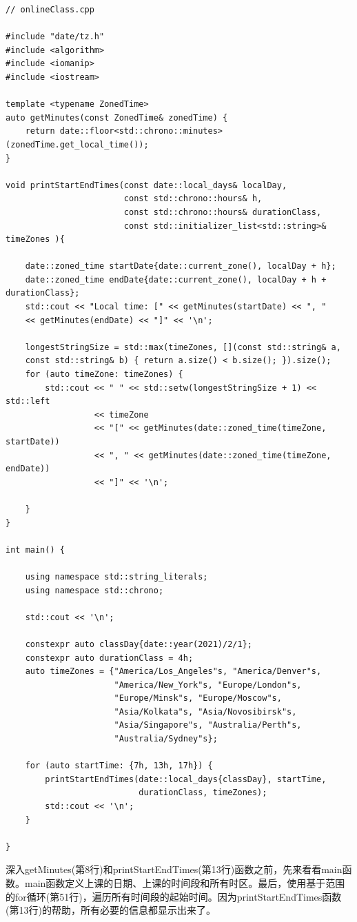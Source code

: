 \begin{lstlisting}[style=styleCXX]
// onlineClass.cpp

#include "date/tz.h"
#include <algorithm>
#include <iomanip>
#include <iostream>

template <typename ZonedTime>
auto getMinutes(const ZonedTime& zonedTime) {
	return date::floor<std::chrono::minutes>(zonedTime.get_local_time());
}

void printStartEndTimes(const date::local_days& localDay,
						const std::chrono::hours& h,
						const std::chrono::hours& durationClass,
						const std::initializer_list<std::string>& timeZones ){
	
	date::zoned_time startDate{date::current_zone(), localDay + h};
	date::zoned_time endDate{date::current_zone(), localDay + h + durationClass};
	std::cout << "Local time: [" << getMinutes(startDate) << ", "
	<< getMinutes(endDate) << "]" << '\n';
	
	longestStringSize = std::max(timeZones, [](const std::string& a,
	const std::string& b) { return a.size() < b.size(); }).size();
	for (auto timeZone: timeZones) {
		std::cout << " " << std::setw(longestStringSize + 1) << std::left
		          << timeZone
		          << "[" << getMinutes(date::zoned_time(timeZone, startDate))
		          << ", " << getMinutes(date::zoned_time(timeZone, endDate))
		          << "]" << '\n';
		
	}
}

int main() {

	using namespace std::string_literals;
	using namespace std::chrono;
	
	std::cout << '\n';
	
	constexpr auto classDay{date::year(2021)/2/1};
	constexpr auto durationClass = 4h;
	auto timeZones = {"America/Los_Angeles"s, "America/Denver"s,
					  "America/New_York"s, "Europe/London"s,
					  "Europe/Minsk"s, "Europe/Moscow"s,
					  "Asia/Kolkata"s, "Asia/Novosibirsk"s,
					  "Asia/Singapore"s, "Australia/Perth"s,
					  "Australia/Sydney"s};
	
	for (auto startTime: {7h, 13h, 17h}) {
		printStartEndTimes(date::local_days{classDay}, startTime,
						   durationClass, timeZones);
		std::cout << '\n';
	}

}
\end{lstlisting}

深入getMinutes(第8行)和printStartEndTimes(第13行)函数之前，先来看看main函数。main函数定义上课的日期、上课的时间段和所有时区。最后，使用基于范围的for循环(第51行)，遍历所有时间段的起始时间。因为printStartEndTimes函数(第13行)的帮助，所有必要的信息都显示出来了。

